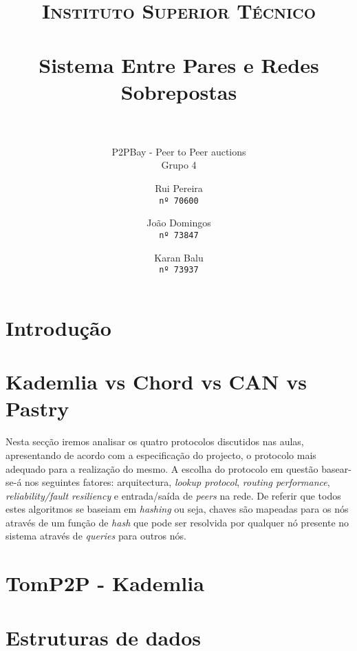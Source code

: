 \documentclass[paper=a4, fontsize=11pt]{scrartcl}
\title{
		\usefont{OT1}{bch}{b}{n}
		\normalfont \normalsize \textsc{Instituto Superior Técnico} \\ [25pt]
		\horrule{0.5pt} \\[0.4cm]
		\huge Sistema Entre Pares e Redes Sobrepostas \\
		\horrule{2pt} \\[0.5cm]
}
\subtitle{P2PBay - Peer to Peer auctions\\\vspace{5mm}\small Grupo 4}
\author{
  \normalsize Rui Pereira\\
  \normalsize \texttt{nº 70600}
  \and
  \normalsize João Domingos\\
  \normalsize \texttt{nº 73847}
  \and
  \normalsize Karan Balu\\
  \normalsize \texttt{nº 73937}
}
\date{}
\numberwithin{equation}{section}		%
\numberwithin{figure}{section}			%
\numberwithin{table}{section}				%
\begin{document}
\maketitle
\section{Introdução}
\section{Kademlia vs Chord vs CAN vs Pastry}
Nesta secção iremos analisar os quatro protocolos discutidos nas aulas, apresentando de acordo com a especificação do projecto, o protocolo mais
adequado para a realização do mesmo. A escolha do protocolo em questão basear-se-á nos seguintes fatores: arquitectura, \textit{lookup protocol}, \textit{routing performance}, \textit{reliability/fault resiliency} e entrada/saída de \textit{peers} na rede. De referir que todos estes algoritmos
se baseiam em \textit{hashing} ou seja, chaves são mapeadas para os nós através de um função de \textit{hash} que pode ser resolvida por qualquer 
nó presente no sistema através de \textit{queries} para outros nós.
\section{TomP2P - Kademlia}
\section{Estruturas de dados}
\end{document}
